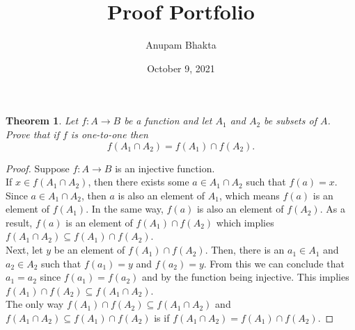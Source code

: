 \documentclass[11pt]{article}
\date{October 9, 2021}
\title{Proof Portfolio}
\author{Anupam Bhakta}
\newtheorem{theorem}{Theorem}
\begin{document}
	
\maketitle

\begin{theorem}
	Let $f:A\to B$ be a function and let $A_1$ and $A_2$ be subsets of $A$.  Prove that if $f$ is one-to-one then 
	\[f(A_1\cap A_2)=f(A_1)\cap f(A_2).\]
\end{theorem}

\begin{proof}
	Suppose $f:A\to B$ is an injective function. \\

	If $x \in f(A_1 \cap A_2)$, then there exists some $a \in A_1 \cap A_2$ such that $f(a) = x$. Since $a\in A_1\cap A_2$, then $a$ is also an element of $A_1$, which means $f(a)$ is an element of $f(A_1)$. In the same way, $f(a)$ is also an element of $f(A_2)$. As a result, $f(a)$ is an element of $f(A_1)\cap f(A_2)$ which implies $f(A_1\cap A_2)\subseteq f(A_1)\cap f(A_2)$. \\

	Next, let $y$ be an element of $f(A_1)\cap f(A_2)$. Then, there is an $a_1\in A_1$ and $a_2\in A_2$ such that $f(a_1)=y$ and $f(a_2)=y$. From this we can conclude that $a_1=a_2$ since $f(a_1)=f(a_2)$ and by the function being injective. This implies $f(A_1)\cap f(A_2)\subseteq f(A_1\cap A_2)$. \\

	The only way $f(A_1)\cap f(A_2)\subseteq f(A_1\cap A_2)$ and $f(A_1\cap A_2)\subseteq f(A_1)\cap f(A_2)$ is if $f(A_1\cap A_2)=f(A_1)\cap f(A_2)$.
\end{proof}
\end{document}
